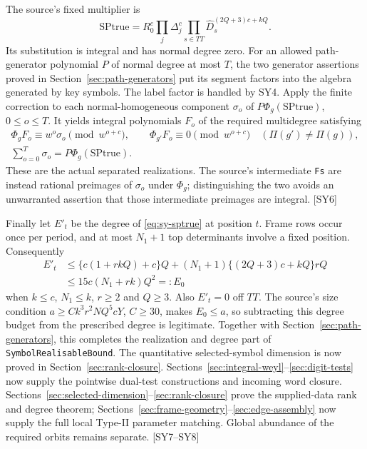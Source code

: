 \documentclass[11pt,a4paper]{article}
\numberwithin{equation}{section}
\theoremstyle{remark}\newtheorem{remark}[theorem]{Remark}
\begin{document}
The source's fixed multiplier is
\begin{equation}\label{eq:sy-sptrue}
\mathrm{SPtrue}=R_0^c\prod_j\Delta_j^c
                    \prod_{s\in TT}\widehat D_s^{(2Q+3)c+kQ}.
\end{equation}
Its substitution is integral and has normal degree zero. For an allowed path-generator polynomial $P$ of normal degree at most $T$, the two generator assertions proved in Section~\ref{sec:path-generators} put its segment factors into the algebra generated by key symbols. The label factor is handled by SY4. Apply the finite correction to each normal-homogeneous component $\sigma_o$ of $P\Phi_g(\mathrm{SPtrue})$, $0\le o\le T$. It yields integral polynomials $F_o$ of the required multidegree satisfying
\begin{gather*}
\Phi_gF_o\equiv w^o\sigma_o\pmod {w^{o+c}},\qquad
\Phi_{g'}F_o\equiv0\pmod {w^{o+c}}\quad(\Pi(g')\ne\Pi(g)),\\
\sum_{o=0}^T\sigma_o=P\Phi_g(\mathrm{SPtrue}).
\end{gather*}
These are the actual separated realizations. The source's intermediate \texttt{Fs} are instead rational preimages of $\sigma_o$ under $\Phi_g$; distinguishing the two avoids an unwarranted assertion that those intermediate preimages are integral. \textsf{[SY6]}

Finally let $E'_t$ be the degree of \eqref{eq:sy-sptrue} at position $t$. Frame rows occur once per period, and at most $N_1+1$ top determinants involve a fixed position. Consequently
\begin{align*}
E'_t&\le\{c(1+rkQ)+c\}Q
 +(N_1+1)\{(2Q+3)c+kQ\}rQ\\
&\le15c(N_1+rk)Q^2=:E_0
\end{align*}
when $k\le c$, $N_1\le k$, $r\ge2$ and $Q\ge3$. Also $E'_t=0$ off $TT$. The source's size condition $a\ge Ck^3r^2NQ^5cY$, $C\ge30$, makes $E_0\le a$, so subtracting this degree budget from the prescribed degree is legitimate. Together with Section~\ref{sec:path-generators}, this completes the realization and degree part of \texttt{SymbolRealisableBound}. The quantitative selected-symbol dimension is now proved in Section~\ref{sec:rank-closure}. Sections~\ref{sec:integral-weyl}--\ref{sec:digit-tests} now supply the pointwise dual-test constructions and incoming word closure. Sections~\ref{sec:selected-dimension}--\ref{sec:rank-closure} prove the supplied-data rank and degree theorem; Sections~\ref{sec:frame-geometry}--\ref{sec:edge-assembly} now supply the full local Type-II parameter matching. Global abundance of the required orbits remains separate. \textsf{[SY7--SY8]}
\end{document}
